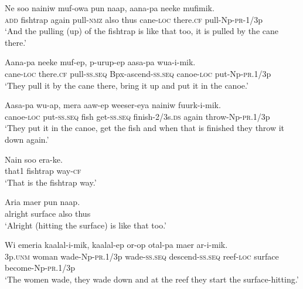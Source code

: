 \ea\label{ex:a:x21}
\gll  Ne  soo  nainiw  muf-owa  pun  naap,  aana-pa  neeke  mufimik. \\
\textsc{add}  fishtrap  again  pull-\textsc{nmz}  also  thus  cane-\textsc{loc}  there.\textsc{cf}  pull-Np-\textsc{pr}-1/3p \\


\glt ‘And the pulling (up) of the fishtrap is like that too, it is pulled by the cane there.’ \\
\z


\ea\label{ex:a:x22}
\gll  Aana-pa  neeke  muf-ep,  p-urup-ep               aasa-pa  wua-i-mik. \\
cane-\textsc{loc}  there.\textsc{cf}  pull-\textsc{ss.seq}  Bpx-ascend-\textsc{ss.seq}     canoe-\textsc{loc}  put-Np-\textsc{pr}.1/3p \\


\glt ‘They pull it by the cane there, bring it up and put it in the canoe.’ \\
\z


\ea\label{ex:a:x23}
\gll  Aasa-pa  wu-ap,  mera  aaw-ep  weeser-eya           nainiw  fuurk-i-mik. \\
canoe-\textsc{loc}  put-\textsc{ss.seq}  fish  get-\textsc{ss.seq}  finish-2/3s.\textsc{ds}   again  throw-Np-\textsc{pr}.1/3p \\


\glt ‘They put it in the canoe, get the fish and when that is finished they throw it down again.’ \\
\z


\ea\label{ex:a:x24}
\gll  Nain  soo  era-ke. \\
that1  fishtrap  way-\textsc{cf} \\
\glt ‘That is the fishtrap way.’ \\
\z


\ea\label{ex:a:x25}
\gll  Aria  maer  pun  naap. \\
alright  surface  also  thus \\
\glt ‘Alright (hitting the surface) is like that too.’ \\
\z


\ea\label{ex:a:x26}
\gll  Wi  emeria  kaalal-i-mik,  kaalal-ep     or-op  otal-pa  maer  ar-i-mik. \\
3p.\textsc{unm}  woman  wade{}-Np-\textsc{pr}.1/3p  wade-\textsc{ss.seq}  descend-\textsc{ss.seq}  reef-\textsc{loc}  surface  become-Np-\textsc{pr}.1/3p \\


\glt ‘The women wade, they wade down and at the reef they start the surface-hitting.’ \\
\z


